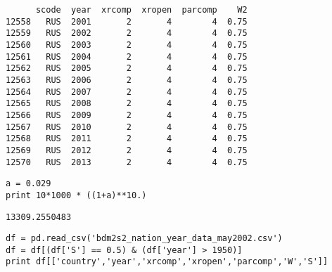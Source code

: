 \documentclass[12pt,fleqn]{article}\usepackage{common}
\begin{document}
\begin{verbatim}
      scode  year  xrcomp  xropen  parcomp    W2
12558   RUS  2001       2       4        4  0.75
12559   RUS  2002       2       4        4  0.75
12560   RUS  2003       2       4        4  0.75
12561   RUS  2004       2       4        4  0.75
12562   RUS  2005       2       4        4  0.75
12563   RUS  2006       2       4        4  0.75
12564   RUS  2007       2       4        4  0.75
12565   RUS  2008       2       4        4  0.75
12566   RUS  2009       2       4        4  0.75
12567   RUS  2010       2       4        4  0.75
12568   RUS  2011       2       4        4  0.75
12569   RUS  2012       2       4        4  0.75
12570   RUS  2013       2       4        4  0.75
\end{verbatim}

\begin{verbatim}
a = 0.029
print 10*1000 * ((1+a)**10.)
\end{verbatim}

\begin{verbatim}
13309.2550483
\end{verbatim}

\begin{verbatim}
df = pd.read_csv('bdm2s2_nation_year_data_may2002.csv')
df = df[(df['S'] == 0.5) & (df['year'] > 1950)]
print df[['country','year','xrcomp','xropen','parcomp','W','S']]
\end{verbatim}
\end{document}
